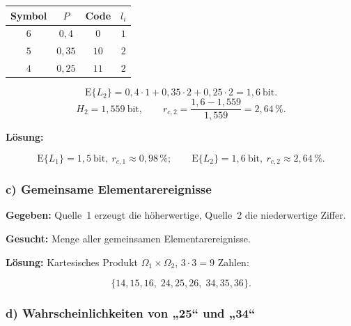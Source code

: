 \begin{beispiel}
\begin{center}
\begin{tabular}{c|c|c|c}
Symbol & $P$ & Code & $l_i$ \\ \hline
$6$ & $0{,}4$  & $0$  & $1$ \\
$5$ & $0{,}35$ & $10$ & $2$ \\
$4$ & $0{,}25$ & $11$ & $2$ \\
\end{tabular}
\end{center}

$$
\mathrm{E}\{L_2\} = 0{,}4\cdot 1 + 0{,}35\cdot 2 + 0{,}25\cdot 2 = 1{,}6\ \text{bit}.
$$
$$
H_2 = 1{,}559\ \text{bit}, \qquad
r_{c,2} = \frac{1{,}6 - 1{,}559}{1{,}559} = 2{,}64\,\%.
$$

\textbf{Lösung:}

$$
\boxed{\;\mathrm{E}\{L_1\} = 1{,}5\ \text{bit},\ r_{c,1} \approx 0{,}98\,\%;
\qquad \mathrm{E}\{L_2\} = 1{,}6\ \text{bit},\ r_{c,2} \approx 2{,}64\,\%.\;}
$$

\end{beispiel}

\subsubsection*{c) Gemeinsame Elementarereignisse}

\begin{beispiel}

\textbf{Gegeben:} Quelle~1 erzeugt die höherwertige, Quelle~2 die
niederwertige Ziffer.

\textbf{Gesucht:} Menge aller gemeinsamen Elementarereignisse.

\textbf{Lösung:} Kartesisches Produkt $\Omega_1 \times \Omega_2$, $3\cdot 3 = 9$
Zahlen:

$$
\boxed{\;\{14,15,16,\;24,25,26,\;34,35,36\}.\;}
$$

\end{beispiel}

\subsubsection*{d) Wahrscheinlichkeiten von „25`` und „34``}

